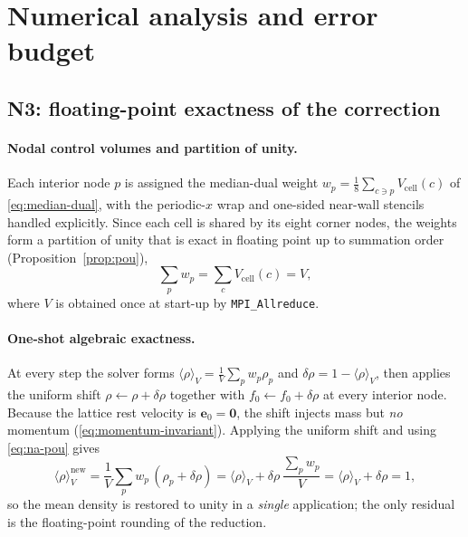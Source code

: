 \documentclass[11pt]{article}
\theoremstyle{definition}
\theoremstyle{remark}
\begin{document}
\section{Numerical analysis and error budget}
\label{sec:numerical-analysis}

\subsection{N3: floating-point exactness of the correction}
\label{sec:na-N3}

\paragraph{Nodal control volumes and partition of unity.}
Each interior node $p$ is assigned the median-dual weight
$w_p=\tfrac18\sum_{c\ni p}V_{\mathrm{cell}}(c)$ of \eqref{eq:median-dual}, with the
periodic-$x$ wrap and one-sided near-wall stencils handled explicitly. Since each
cell is shared by its eight corner nodes, the weights form a partition of unity
that is exact in floating point up to summation order
(Proposition~\ref{prop:pou}),
\begin{equation}
  \sum_p w_p = \sum_c V_{\mathrm{cell}}(c) = V ,
  \label{eq:na-pou}
\end{equation}
where $V$ is obtained once at start-up by \texttt{MPI\_Allreduce}.

\paragraph{One-shot algebraic exactness.}
At every step the solver forms $\langle\rho\rangle_V=\tfrac1V\sum_p w_p\rho_p$ and
$\delta\rho=1-\langle\rho\rangle_V$, then applies the uniform shift
$\rho\leftarrow\rho+\delta\rho$ together with $f_0\leftarrow f_0+\delta\rho$ at
every interior node. Because the lattice rest velocity is
$\mathbf{e}_0=\mathbf{0}$, the shift injects mass but \emph{no} momentum
(\eqref{eq:momentum-invariant}). Applying the uniform shift and using
\eqref{eq:na-pou} gives
\begin{equation}
  \langle\rho\rangle_V^{\text{new}}
  = \frac{1}{V}\sum_p w_p\,(\rho_p+\delta\rho)
  = \langle\rho\rangle_V + \delta\rho\,\frac{\sum_p w_p}{V}
  = \langle\rho\rangle_V + \delta\rho = 1 ,
  \label{eq:na-oneshot}
\end{equation}
so the mean density is restored to unity in a \emph{single} application; the only
residual is the floating-point rounding of the reduction.
\end{document}
